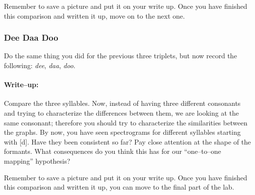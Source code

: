 Remember to save a picture and put it on your write up. Once you have finished this comparison and written it up, move on to the next one.

\subsubsection{Dee Daa Doo}

Do the same thing you did for the previous three triplets, but now record the following: \emph{dee}, \emph{daa}, \emph{doo}.

\paragraph{Write--up:} Compare the three syllables. Now, instead of having three different consonants and trying to characterize the differences between them, we are looking at the same consonant; therefore you should try to characterize the similarities between the graphs. By now, you have seen spectrograms for different syllables starting with [d]. Have they been consistent so far? Pay close attention at the shape of the formants. What consequences do you think this has for our ``one--to--one mapping'' hypothesis?

Remember to save a picture and put it on your write up. Once you have finished this comparison and written it up, you can move to the final part of the lab.
